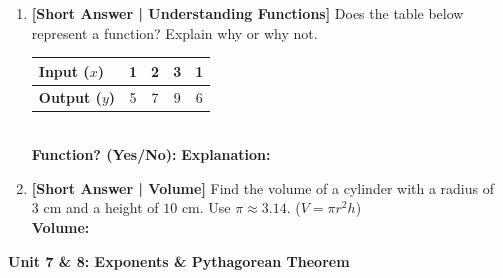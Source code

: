 \documentclass[12pt, letterpaper, fleqn]{article}
\newcommand{\blankshorter}{\underline{\hspace{2.0cm}}}
\newcommand{\blanklong}{\underline{\hspace{6.5cm}}}
\begin{document}
\begin{enumerate}[leftmargin=0.6cm, itemsep=\fill, start=7]

\item \textbf{[Short Answer | Understanding Functions]} Does the table below represent a function? Explain why or why not.
\begin{center}
\renewcommand{\arraystretch}{1.3}
\begin{tabular}{|l|c|c|c|c|}
\hline
\textbf{Input ($x$)} & 1 & 2 & 3 & 1 \\ \hline
\textbf{Output ($y$)} & 5 & 7 & 9 & 6 \\ \hline
\end{tabular}
\end{center}
\vspace{1.5cm} \\
\textbf{Function? (Yes/No):} \blankshorter \quad \textbf{Explanation:} \blanklong

\item \textbf{[Short Answer | Volume]} Find the volume of a cylinder with a radius of $3\text{ cm}$ and a height of $10\text{ cm}$. Use $\pi \approx 3.14$. ($V = \pi r^2 h$)
\vspace{2cm} \\
\textbf{Volume:} \blanklong

\end{enumerate}

\vspace{0.5cm}
\newpage

\begin{tcolorbox}[colback=white, colframe=black, arc=2mm]
    \textbf{Unit 7 \& 8: Exponents \& Pythagorean Theorem}
\end{tcolorbox}
\end{document}

